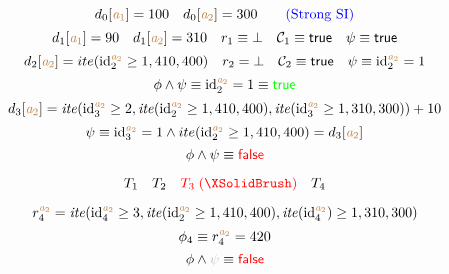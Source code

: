 \begin{frame}{}
	\[
		d_{0}[\textcolor{brown}{\mathit{a}_{1}}] = 100 \quad d_{0}[\textcolor{brown}{\mathit{a}_{2}}] = 300 \qquad \textcolor{blue}{\text{(Strong SI)}}
	\]
	\pause
	\[
		d_{1}[\textcolor{brown}{\mathit{a}_{1}}] = 90 \quad
		d_{1}[\textcolor{brown}{\mathit{a}_{2}}] = 310 \quad
		r_{1} \equiv \bot \quad
		\mathcal{C}_{1} \equiv \mathsf{true} \quad
		\psi \equiv \mathsf{true}
	\]
	\vspace{-0.30cm}
	\pause
	\[
		d_{2}[\textcolor{brown}{\mathit{a}_{2}}] = ite(\textup{id}_{2}^{\textcolor{brown}{\mathit{a}_{2}}} \ge 1, 410, 400) \quad
		r_{2} = \bot \quad
		\mathcal{C}_{2} \equiv \mathsf{true} \quad
		\psi \equiv \textup{id}_{2}^{\textcolor{brown}{\mathit{a}_{2}}} = 1
	\]
	\vspace{-0.40cm}
	\[
		\phi \land \psi \equiv \textup{id}_{2}^{\textcolor{brown}{\mathit{a}_{2}}} = 1 \equiv \textcolor{green}{\mathsf{true}}
	\]
	\pause
	\[
		d_{3}[\textcolor{brown}{\mathit{a}_{2}}] = \mathit{ite}(\textup{id}_{3}^{\textcolor{brown}{\mathit{a}_{2}}} \ge 2,
		  \mathit{ite}(\textup{id}_{2}^{\textcolor{brown}{\mathit{a}_{2}}} \ge 1, 410, 400),
			\mathit{ite}(\textup{id}_{3}^{\textcolor{brown}{\mathit{a}_{2}}} \ge 1, 310, 300)) + 10
	\]
	\vspace{-0.40cm}
	\[
		\psi \equiv \textup{id}_{3}^{\textcolor{brown}{\mathit{a}_{2}}} = 1 \land
		  ite(\textup{id}_{2}^{\textcolor{brown}{\mathit{a}_{2}}} \ge 1, 410, 400) = d_{3}[\textcolor{brown}{\mathit{a}_{2}}]
	\]
	\vspace{-0.40cm}
	\[
		\phi \land \psi \equiv \textcolor{red}{\mathsf{false}}
	\]
\end{frame}

\begin{frame}{}
	\[
		T_{1}\quad T_{2}\quad \red{T_{3} \;(\text{\no})}\quad T_{4}
	\]

	\pause
	\[
		r_{4}^{\textcolor{brown}{\mathit{a}_{2}}} = \mathit{ite}(\textup{id}_{4}^{\textcolor{brown}{\mathit{a}_{2}}} \ge 3,
		  \mathit{ite}(\textup{id}_{2}^{\textcolor{brown}{\mathit{a}_{2}}} \ge 1, 410, 400),
			\mathit{ite}(\textup{id}_{4}^{\textcolor{brown}{\mathit{a}_{2}}}) \ge 1, 310, 300)
	\]
	\pause
	\vspace{-0.40cm}
	\[
		\phi_{4} \equiv r_{4}^{\textcolor{brown}{\mathit{a}_{2}}} = 420
	\]
	\pause
	\vspace{-0.40cm}
	\[
		\phi \land \lgray{\psi} \equiv \red{\false}
	\]
\end{frame}

\begin{frame}{}
	\pause
\end{frame}

\begin{frame}{}
	\begin{center}
		\vspace{0.30cm}
		\vspace{0.30cm}
	\end{center}
\end{frame}
